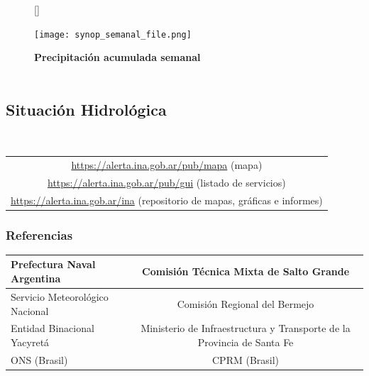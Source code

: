 \documentclass[11pt,spanish] {article}
\DeclareRobustCommand{\situacionmeteorologica}{}
\DeclareRobustCommand{\synoptext}{}
\DeclareRobustCommand{\situacionhidrologica}{}
\DeclareRobustCommand{\comentariofinal}{}
\begin{document}
\begin{figure}[H]
	[\FBwidth]
	{\caption{\textbf{Precipitación acumulada semanal}\\\hspace{\textwidth}\\\hspace{\textwidth}\textbf{\synoptext}}\label{synopmap}}
	{\texttt{[image: synop\_semanal\_file.png]}}
\end{figure}
\situacionmeteorologica
\subsection*{Situación Hidrológica}
	\situacionhidrologica

 \\
\begin{tabular}{c}
\href{https://alerta.ina.gob.ar/pub/mapa}{https://alerta.ina.gob.ar/pub/mapa} (mapa) \\
\href{https://alerta.ina.gob.ar/pub/gui}{https://alerta.ina.gob.ar/pub/gui} (listado de servicios) \\
\href{https://alerta.ina.gob.ar/ina}{https://alerta.ina.gob.ar/ina} (repositorio de mapas, gráficas e informes) \\
\end{tabular}
\center{\comentariofinal}
\subsubsection{Referencias}
\begin{tabularx}{\textwidth}{|X|c|}
	\hline
	Prefectura Naval Argentina & Comisión Técnica Mixta de Salto Grande \\
	\hline
	Servicio Meteorológico Nacional & Comisión Regional del Bermejo \\
	\hline
	Entidad Binacional Yacyretá & Ministerio de Infraestructura y Transporte de la Provincia de Santa Fe \\
	\hline
	ONS (Brasil) & CPRM (Brasil) \\
	\hline
\end{tabularx}
\end{document}
